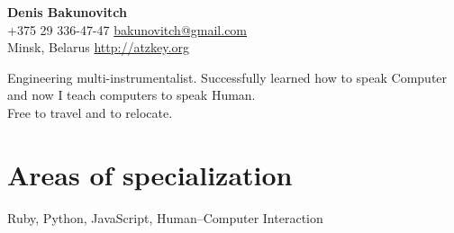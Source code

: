 \documentclass[12pt, a4paper]{article}
\begin{document}
  \newlength{\rcollength}\setlength{\rcollength}{1.85in}%

  \textbf{\Huge Denis Bakunovitch}\\
  {\lining+375 29 336-47-47} \hfill \href{mailto:bakunovitch@gmail.com}{bakunovitch@gmail.com}\\
  Minsk, Belarus \hfill \href{http://atzkey.org}{http://atzkey.org}\\
  \quad\pagebreak[2]
  \hrulefill

  Engineering multi-instrumentalist. Successfully learned how to speak Computer and now I teach computers to speak Human.\\
  Free to travel and to relocate.

  \section*{Areas of specialization}
  Ruby, Python, JavaScript, Human--Computer Interaction

\end{document}
